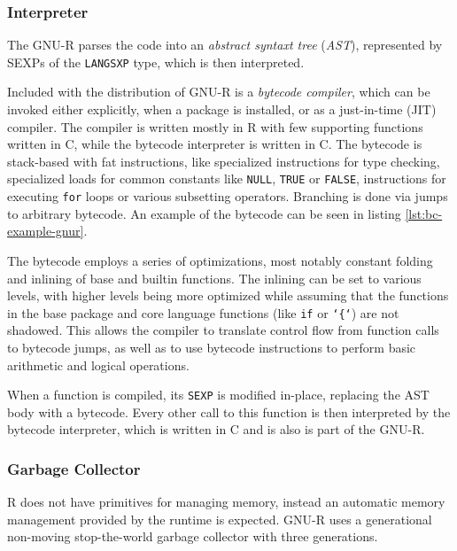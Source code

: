\subsubsection*{Interpreter}

The GNU-R parses the code into an \textit{abstract syntaxt tree} (\textit{AST}), represented by SEXPs of the \texttt{LANGSXP} type, which is then interpreted.

Included with the distribution of GNU-R is a \textit{bytecode compiler}, which can be invoked either explicitly, when a package is installed, or as a just-in-time (JIT) compiler. The compiler is written mostly in R with few supporting functions written in C, while the bytecode interpreter is written in C. The bytecode is stack-based with fat instructions, like specialized instructions for type checking, specialized loads for common constants like \texttt{NULL}, \texttt{TRUE} or \texttt{FALSE}, instructions for executing \texttt{for} loops or various subsetting operators. Branching is done via jumps to arbitrary bytecode. An example of the bytecode can be seen in listing \ref{lst:bc-example-gnur}.

The bytecode employs a series of optimizations, most notably constant folding and inlining of base and builtin functions. The inlining can be set to various levels, with higher levels being more optimized while assuming that the functions in the base package and core language functions (like \texttt{if} or \texttt{`\{`}) are not shadowed. This allows the compiler to translate control flow from function calls to bytecode jumps, as well as to use bytecode instructions to perform basic arithmetic and logical operations.

When a function is compiled, its \texttt{SEXP} is modified in-place, replacing the AST body with a bytecode. Every other call to this function is then interpreted by the bytecode interpreter, which is written in C and is also is part of the GNU-R.



\subsubsection*{Garbage Collector}
R does not have primitives for managing memory, instead an automatic memory management provided by the runtime is expected. GNU-R uses a generational non-moving stop-the-world garbage collector with three generations\cite{r-gc-notes}.

